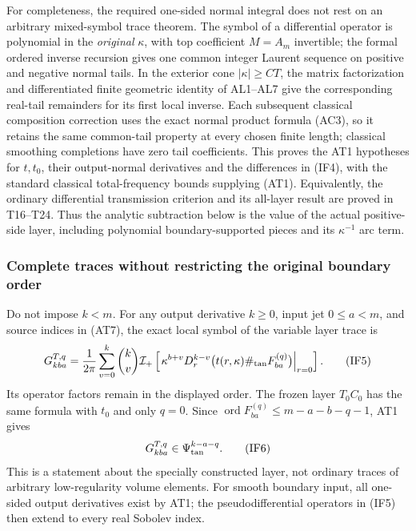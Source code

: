 \documentclass[
  11pt,
]{article}
\begin{document}
For completeness, the required one-sided normal integral does not rest
on an arbitrary mixed-symbol trace theorem. The symbol of a differential
operator is polynomial in the \emph{original} \(\kappa\), with top
coefficient \(M=A_m\) invertible; the formal ordered inverse recursion
gives one common integer Laurent sequence on positive and negative
normal tails. In the exterior cone \(|\kappa|\geq CT\), the matrix
factorization and differentiated finite geometric identity of AL1--AL7
give the corresponding real-tail remainders for its first local inverse.
Each subsequent classical composition correction uses the exact normal
product formula (AC3), so it retains the same common-tail property at
every chosen finite length; classical smoothing completions have zero
tail coefficients. This proves the AT1 hypotheses for \(t,t_0\), their
output-normal derivatives and the differences in (IF4), with the
standard classical total-frequency bounds supplying (AT1). Equivalently,
the ordinary differential transmission criterion and its all-layer
result are proved in T16--T24. Thus the analytic subtraction below is
the value of the actual positive-side layer, including polynomial
boundary-supported pieces and its \(\kappa^{-1}\) arc term.

\subsubsection{Complete traces without restricting the original boundary
order}\label{complete-traces-without-restricting-the-original-boundary-order}

Do not impose \(k<m\). For any output derivative \(k\geq0\), input jet
\(0\leq a<m\), and source indices in (AT7), the exact local symbol of
the variable layer trace is \[
 G^{T,q}_{kba}
 =\frac1{2\pi}\sum_{v=0}^k\binom{k}{v}
   \mathcal I_+\left[
     \left.\kappa^{b+v}D_r^{k-v}
       \bigl(t(r,\kappa)\#_{\rm tan}F_{ba}^{(q)}\bigr)
     \right|_{r=0}\right].
 \tag{IF5}
\] Its operator factors remain in the displayed order. The frozen layer
\(T_0C_0\) has the same formula with \(t_0\) and only \(q=0\). Since
\(\operatorname{ord}F_{ba}^{(q)}\leq m-a-b-q-1\), AT1 gives \[
 G^{T,q}_{kba}\in\Psi_{\rm tan}^{k-a-q}.
 \tag{IF6}
\] This is a statement about the specially constructed layer, not
ordinary traces of arbitrary low-regularity volume elements. For smooth
boundary input, all one-sided output derivatives exist by AT1; the
pseudodifferential operators in (IF5) then extend to every real Sobolev
index.
\end{document}
